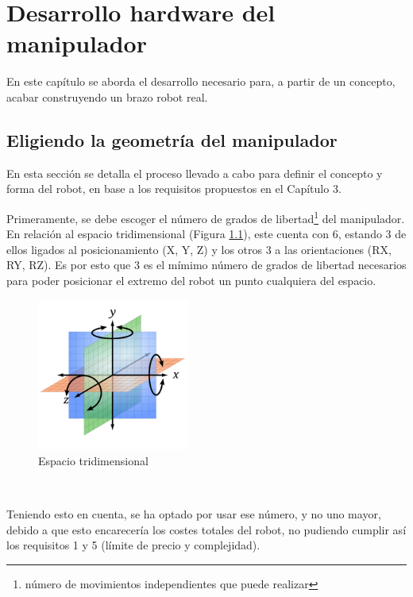 \chapter{Desarrollo hardware del manipulador}
\label{cap:capitulo5}

\vspace{1cm}

\noindent En este capítulo se aborda el desarrollo necesario para, a partir de un concepto, acabar construyendo un brazo robot real. 
\section{Eligiendo la geometría del manipulador}
\label{sec:eligiendo_geometría}
\noindent En esta sección se detalla el proceso llevado a cabo para definir el concepto y forma del robot, en base a 
los requisitos propuestos en el Capítulo 3. 

Primeramente, se debe escoger el número de grados de libertad\footnote{número de movimientos independientes que puede realizar} del manipulador. 
En relación al espacio tridimensional (Figura \ref{fig:espacio_tridimensional}), este cuenta con 6, estando 3 de ellos ligados al 
posicionamiento (X, Y, Z) y los otros 3 a las orientaciones (RX, RY, RZ). Es por esto que 3 es el mímimo número de grados de libertad necesarios 
para poder posicionar el extremo del robot un punto cualquiera del espacio.

\begin{figure} [ht!]
  \begin{center}
    \includegraphics[width=5cm]{figs/coordinates.png}
  \end{center}
  \caption{Espacio tridimensional}
  \label{fig:espacio_tridimensional}
\end{figure}\ 

Teniendo esto en cuenta, se ha optado por usar ese número, y no uno mayor, debido a que esto encarecería los costes totales del robot, no pudiendo cumplir así 
los requisitos 1 y 5 (límite de precio y complejidad). 


